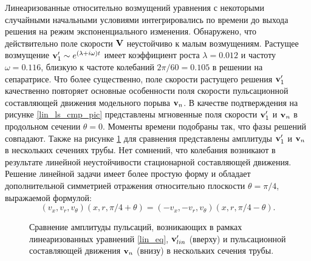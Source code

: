 Линеаризованные относительно возмущений уравнения с некоторыми случайными начальными условиями интегрировались по времени до выхода решения на режим экспоненциального изменения. Обнаружено, что действительно поле скорости $\mathbf{V}$ неустойчиво к малым возмущениям. Растущее возмущение $\mathbf{v}'_1 \sim e^{(\lambda+i\omega)t}$ имеет коэффициент роста $\lambda=0.012$ и частоту $\omega=0.116$, близкую к частоте колебаний $2\pi/60=0.105$ в решении на сепаратрисе. Что более существенно, поле скорости растущего решения $\mathbf{v}'_1$ качественно повторяет основные особенности поля скорости пульсационной составляющей движения модельного порыва $\mathbf{v}_n$. В качестве подтверждения на рисунке \ref{lin_ls_cmp_pic} представлены мгновенные поля скорости $\mathbf{v}'_1$ и $\mathbf{v}_n$ в продольном сечении $\theta = 0$. Моменты времени подобраны так, что фазы решений совпадают. Также на рисунке \ref{lin_amp_cmp_pic} для сравнения представлены амплитуды $\mathbf{v}_1'$ и $\mathbf{v}_n$ в нескольких сечениях трубы. Нет сомнений, что колебания возникают в результате линейной неустойчивости стационарной составляющей движения. Решение линейной задачи имеет более простую форму и обладает дополнительной симметрией отражения относительно плоскости $\theta = \pi/4$, выражаемой формулой:
\begin{equation} \label{dop_sym_eq}
(v_x, v_r, v_\theta)(x, r, \pi/4 + \theta) = (- v_x, - v_r, v_\theta)(x, r, \pi/4 - \theta). 
\end{equation} 

\begin{figure}
\caption{Сравнение амплитуды пульсаций, возникающих в рамках линеаризованных уравнений \eqref{lin_eq}, $\mathbf{v}'_{lin}$ (вверху) и пульсационной составляющей движения $\mathbf{v}_n$ (внизу) в нескольких сечения трубы.}
\label{lin_amp_cmp_pic}
\end{figure}

